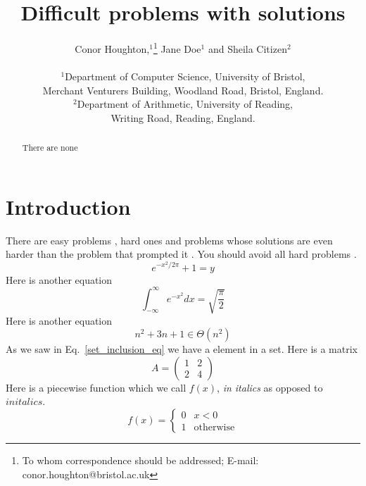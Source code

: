 



\title{Difficult problems with solutions} 

\author
{Conor Houghton,$^{1}$\footnote{To whom correspondence should be addressed; E-mail:  conor.houghton@bristol.ac.uk} Jane Doe$^{1}$ and Sheila Citizen$^{2}$\\
\\
\normalsize{$^{1}$Department of Computer Science, University of Bristol,}\\
\normalsize{Merchant Venturers Building, Woodland Road, Bristol, England.}\\
\normalsize{$^{2}$Department of Arithmetic, University of Reading,}\\
\normalsize{Writing Road, Reading, England.}\\
}

\date{}

\maketitle


\begin{abstract}
There are none
\end{abstract}


\section{Introduction}
There are easy problems \cite{BrainBrainBrain1902a}, hard ones \cite{LightKnight2007a} and problems whose solutions are even harder than the problem that prompted it \cite{Swift1729a}. You should avoid all hard problems \cite{LightKnight2007a,Swift1729a}.
\begin{equation}
e^{-x^2/2\pi}+1=y
\end{equation}
Here is another equation
\begin{equation}
\int_{-\infty}^\infty e^{-x^2}dx=\sqrt{\frac{\pi}{2}}
\end{equation}
Here is another equation
\begin{equation}\label{set_inclusion_eq}
n^2+3n+1\in \Theta(n^2)
\end{equation}
As we saw in Eq.~\ref{set_inclusion_eq} we have a element in a set.
Here is a matrix
\begin{equation}
A=\left(\begin{array}{cc}1&2\\2&4\end{array}\right)
\end{equation}
Here is a piecewise function which we call $f(x)$, \textsl{in italics} as opposed to $in italics$.
\begin{equation}
f(x)=\left\{\begin{array}{cl}0&x<0\\1&\mbox{otherwise}\end{array}\right.
\end{equation}








